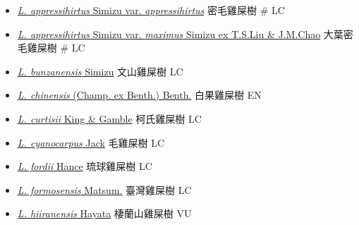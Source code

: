 \begin{itemize}
  \begin{itemize}
        \item[] \href{http://www.theplantlist.org/tpl1.1/search?q=Lasianthus+appressihirtus+var.+appressihirtus}{\textit{L. appressihirtus} Simizu var. \textit{appressihirtus}}   密毛雞屎樹  \# LC
        \item[] \href{http://www.theplantlist.org/tpl1.1/search?q=Lasianthus+appressihirtus+var.+maximus}{\textit{L. appressihirtus} Simizu var. \textit{maximus} Simizu ex T.S.Liu \& J.M.Chao}   大葉密毛雞屎樹  \# LC
        \item[] \href{http://www.theplantlist.org/tpl1.1/search?q=Lasianthus+bunzanensis}{\textit{L. bunzanensis} Simizu}   文山雞屎樹   LC
        \item[] \href{http://www.theplantlist.org/tpl1.1/search?q=Lasianthus+chinensis}{\textit{L. chinensis} (Champ. ex Benth.) Benth.}   白果雞屎樹   EN
        \item[] \href{http://www.theplantlist.org/tpl1.1/search?q=Lasianthus+curtisii}{\textit{L. curtisii} King \& Gamble}   柯氏雞屎樹   LC
        \item[] \href{http://www.theplantlist.org/tpl1.1/search?q=Lasianthus+cyanocarpus}{\textit{L. cyanocarpus} Jack}   毛雞屎樹   LC
        \item[] \href{http://www.theplantlist.org/tpl1.1/search?q=Lasianthus+fordii}{\textit{L. fordii} Hance}   琉球雞屎樹   LC
        \item[] \href{http://www.theplantlist.org/tpl1.1/search?q=Lasianthus+formosensis}{\textit{L. formosensis} Matsum.}   臺灣雞屎樹   LC
        \item[] \href{http://www.theplantlist.org/tpl1.1/search?q=Lasianthus+hiiranensis}{\textit{L. hiiranensis} Hayata}   棲蘭山雞屎樹   VU

\end{itemize}
\end{itemize}
